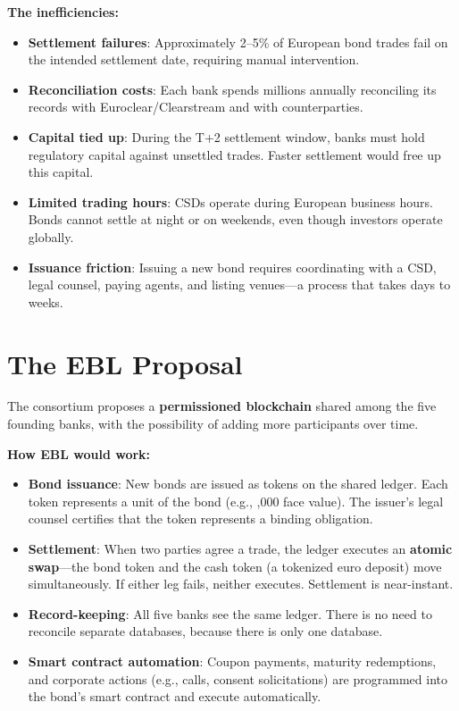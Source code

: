 \documentclass[11pt]{article}
\begin{document}
\medskip
\noindent\textbf{The inefficiencies:}
\begin{itemize}[leftmargin=*]
\item \textbf{Settlement failures}: Approximately 2--5\% of European bond trades fail on the intended settlement date, requiring manual intervention.
\item \textbf{Reconciliation costs}: Each bank spends millions annually reconciling its records with Euroclear/Clearstream and with counterparties.
\item \textbf{Capital tied up}: During the T+2 settlement window, banks must hold regulatory capital against unsettled trades. Faster settlement would free up this capital.
\item \textbf{Limited trading hours}: CSDs operate during European business hours. Bonds cannot settle at night or on weekends, even though investors operate globally.
\item \textbf{Issuance friction}: Issuing a new bond requires coordinating with a CSD, legal counsel, paying agents, and listing venues---a process that takes days to weeks.
\end{itemize}

\section*{The EBL Proposal}

The consortium proposes a \textbf{permissioned blockchain} shared among the five founding banks, with the possibility of adding more participants over time.

\medskip
\noindent\textbf{How EBL would work:}
\begin{itemize}[leftmargin=*]
\item \textbf{Bond issuance}: New bonds are issued as tokens on the shared ledger. Each token represents a unit of the bond (e.g., ,000 face value). The issuer's legal counsel certifies that the token represents a binding obligation.
\item \textbf{Settlement}: When two parties agree a trade, the ledger executes an \textbf{atomic swap}---the bond token and the cash token (a tokenized euro deposit) move simultaneously. If either leg fails, neither executes. Settlement is near-instant.
\item \textbf{Record-keeping}: All five banks see the same ledger. There is no need to reconcile separate databases, because there is only one database.
\item \textbf{Smart contract automation}: Coupon payments, maturity redemptions, and corporate actions (e.g., calls, consent solicitations) are programmed into the bond's smart contract and execute automatically.
\end{itemize}
\end{document}
